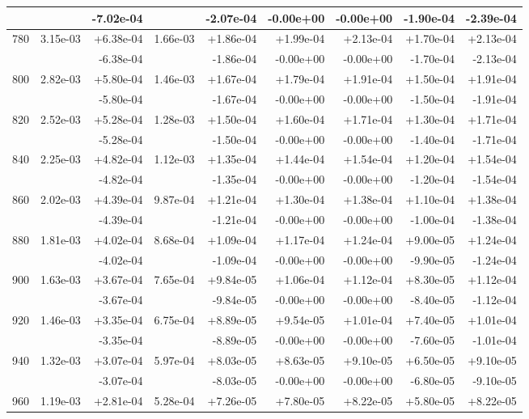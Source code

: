 \begin{tabular}{|c|r|r|r|r|r|r|r|r|}
 & & -7.02e-04  & & -2.07e-04 & -0.00e+00 & -0.00e+00 & -1.90e-04 & -2.39e-04 \\
\hline
780 & 3.15e-03 & +6.38e-04 & 1.66e-03 & +1.86e-04 & +1.99e-04 & +2.13e-04 & +1.70e-04 & +2.13e-04 \\
 & & -6.38e-04  & & -1.86e-04 & -0.00e+00 & -0.00e+00 & -1.70e-04 & -2.13e-04 \\
\hline
800 & 2.82e-03 & +5.80e-04 & 1.46e-03 & +1.67e-04 & +1.79e-04 & +1.91e-04 & +1.50e-04 & +1.91e-04 \\
 & & -5.80e-04  & & -1.67e-04 & -0.00e+00 & -0.00e+00 & -1.50e-04 & -1.91e-04 \\
\hline
820 & 2.52e-03 & +5.28e-04 & 1.28e-03 & +1.50e-04 & +1.60e-04 & +1.71e-04 & +1.30e-04 & +1.71e-04 \\
 & & -5.28e-04  & & -1.50e-04 & -0.00e+00 & -0.00e+00 & -1.40e-04 & -1.71e-04 \\
\hline
840 & 2.25e-03 & +4.82e-04 & 1.12e-03 & +1.35e-04 & +1.44e-04 & +1.54e-04 & +1.20e-04 & +1.54e-04 \\
 & & -4.82e-04  & & -1.35e-04 & -0.00e+00 & -0.00e+00 & -1.20e-04 & -1.54e-04 \\
\hline
860 & 2.02e-03 & +4.39e-04 & 9.87e-04 & +1.21e-04 & +1.30e-04 & +1.38e-04 & +1.10e-04 & +1.38e-04 \\
 & & -4.39e-04  & & -1.21e-04 & -0.00e+00 & -0.00e+00 & -1.00e-04 & -1.38e-04 \\
\hline
880 & 1.81e-03 & +4.02e-04 & 8.68e-04 & +1.09e-04 & +1.17e-04 & +1.24e-04 & +9.00e-05 & +1.24e-04 \\
 & & -4.02e-04  & & -1.09e-04 & -0.00e+00 & -0.00e+00 & -9.90e-05 & -1.24e-04 \\
\hline
900 & 1.63e-03 & +3.67e-04 & 7.65e-04 & +9.84e-05 & +1.06e-04 & +1.12e-04 & +8.30e-05 & +1.12e-04 \\
 & & -3.67e-04  & & -9.84e-05 & -0.00e+00 & -0.00e+00 & -8.40e-05 & -1.12e-04 \\
\hline
920 & 1.46e-03 & +3.35e-04 & 6.75e-04 & +8.89e-05 & +9.54e-05 & +1.01e-04 & +7.40e-05 & +1.01e-04 \\
 & & -3.35e-04  & & -8.89e-05 & -0.00e+00 & -0.00e+00 & -7.60e-05 & -1.01e-04 \\
\hline
940 & 1.32e-03 & +3.07e-04 & 5.97e-04 & +8.03e-05 & +8.63e-05 & +9.10e-05 & +6.50e-05 & +9.10e-05 \\
 & & -3.07e-04  & & -8.03e-05 & -0.00e+00 & -0.00e+00 & -6.80e-05 & -9.10e-05 \\
\hline
960 & 1.19e-03 & +2.81e-04 & 5.28e-04 & +7.26e-05 & +7.80e-05 & +8.22e-05 & +5.80e-05 & +8.22e-05 \\

\end{tabular}

